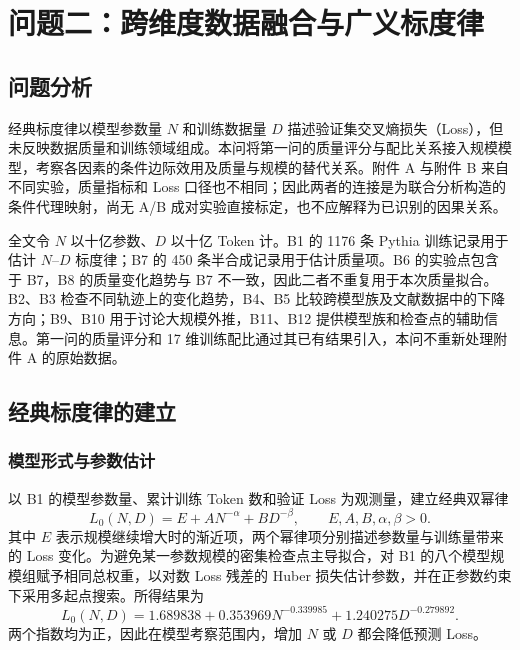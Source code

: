 \setcounter{section}{4}
\section{问题二：跨维度数据融合与广义标度律}
\label{sec:q2}
\setcounter{equation}{0}
\setcounter{figure}{0}
\setcounter{table}{0}

\subsection{问题分析}

经典标度律以模型参数量 $N$ 和训练数据量 $D$ 描述验证集交叉熵损失（Loss）\cite{kaplan2020scaling,hoffmann2022training}，但未反映数据质量和训练领域组成。本问将第一问的质量评分与配比关系接入规模模型，考察各因素的条件边际效用及质量与规模的替代关系。附件 A 与附件 B 来自不同实验，质量指标和 Loss 口径也不相同；因此两者的连接是为联合分析构造的条件代理映射，尚无 A/B 成对实验直接标定，也不应解释为已识别的因果关系。

全文令 $N$ 以十亿参数、$D$ 以十亿 Token 计。B1 的 1176 条 Pythia\cite{pythia2023} 训练记录用于估计 $N$--$D$ 标度律；B7 的 450 条半合成记录用于估计质量项。B6 的实验点包含于 B7，B8 的质量变化趋势与 B7 不一致，因此二者不重复用于本次质量拟合。B2、B3 检查不同轨迹上的变化趋势，B4、B5 比较跨模型族及文献数据中的下降方向；B9、B10 用于讨论大规模外推，B11、B12 提供模型族和检查点的辅助信息。第一问的质量评分和 17 维训练配比通过其已有结果引入，本问不重新处理附件 A 的原始数据。

\subsection{经典标度律的建立}

\subsubsection{模型形式与参数估计}

以 B1 的模型参数量、累计训练 Token 数和验证 Loss 为观测量，建立经典双幂律\cite{hoffmann2022training}
\begin{equation}
 L_0(N,D)=E+A N^{-\alpha}+B D^{-\beta},
 \qquad E,A,B,\alpha,\beta>0.
 \label{eq:q2-classic}
\end{equation}
其中 $E$ 表示规模继续增大时的渐近项，两个幂律项分别描述参数量与训练量带来的 Loss 变化。为避免某一参数规模的密集检查点主导拟合，对 B1 的八个模型规模组赋予相同总权重，以对数 Loss 残差的 Huber\cite{huber2020} 损失估计参数，并在正参数约束下采用多起点搜索。所得结果为
\begin{equation}
 L_0(N,D)=1.689838+0.353969N^{-0.339985}
              +1.240275D^{-0.279892}.
 \label{eq:q2-classic-fit}
\end{equation}
两个指数均为正，因此在模型考察范围内，增加 $N$ 或 $D$ 都会降低预测 Loss。

